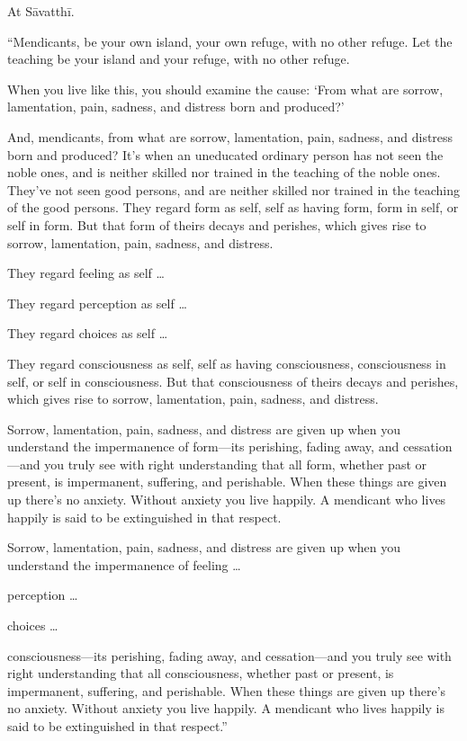 \documentclass[12pt,openany]{book}%
\begin{document}
At \textsanskrit{Sāvatthī}. 

“Mendicants, be your own island, your own refuge, with no other refuge. Let the teaching be your island and your refuge, with no other refuge. 

When you live like this, you should examine the cause: ‘From what are sorrow, lamentation, pain, sadness, and distress born and produced?’ 

And, mendicants, from what are sorrow, lamentation, pain, sadness, and distress born and produced? It’s when an uneducated ordinary person has not seen the noble ones, and is neither skilled nor trained in the teaching of the noble ones. They’ve not seen good persons, and are neither skilled nor trained in the teaching of the good persons. They regard form as self, self as having form, form in self, or self in form. But that form of theirs decays and perishes, which gives rise to sorrow, lamentation, pain, sadness, and distress. 

They regard feeling as self … 

They regard perception as self … 

They regard choices as self … 

They regard consciousness as self, self as having consciousness, consciousness in self, or self in consciousness. But that consciousness of theirs decays and perishes, which gives rise to sorrow, lamentation, pain, sadness, and distress. 

Sorrow, lamentation, pain, sadness, and distress are given up when you understand the impermanence of form—its perishing, fading away, and cessation—and you truly see with right understanding that all form, whether past or present, is impermanent, suffering, and perishable. When these things are given up there’s no anxiety. Without anxiety you live happily. A mendicant who lives happily is said to be extinguished in that respect. 

Sorrow, lamentation, pain, sadness, and distress are given up when you understand the impermanence of feeling … 

perception … 

choices … 

consciousness—its perishing, fading away, and cessation—and you truly see with right understanding that all consciousness, whether past or present, is impermanent, suffering, and perishable. When these things are given up there’s no anxiety. Without anxiety you live happily. A mendicant who lives happily is said to be extinguished in that respect.” 
\end{document}
